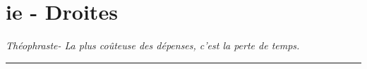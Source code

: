 \documentclass[10pt]{article}
\newcommand{\horrule}[1]{\rule{\linewidth}{#1}} %
\begin{document}

\newtheorem{Definition}{Définition}
\newtheorem{Theorem}{Théorème}
\newtheorem{Proposition}{Propriété}

\renewcommand{\labelitemi}{$\bullet$}
\renewcommand{\labelitemii}{$\circ$}

\setlength{\columnseprule}{0.5pt}

\section*{ie - Droites}
\begin{center}
  \textit{Théophraste- La plus coûteuse des dépenses, c’est la perte de temps.}
\end{center}
\horrule{2px}
\end{document}
